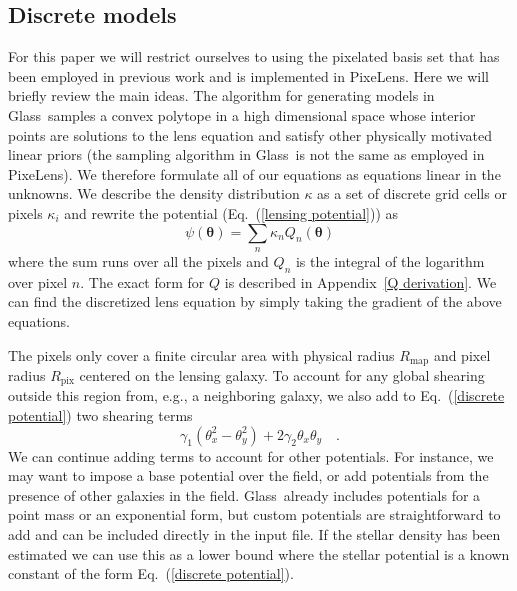 \documentclass[galley,usenatbib]{mn2e}
\newcommand{\Glass}{{\sc Glass}}
\newcommand{\PixeLens}{{\sc PixeLens}}
\newcommand{\Rmap}{\ensuremath{R_\mathrm{map}}}
\newcommand{\Rpix}{\ensuremath{R_\mathrm{pix}}}
\newcommand{\eqnref}[1] {Eq.~(\ref{#1})}
\newcommand{\appref}[1] {Appendix~\ref{#1}}
\renewcommand{\vec}[1]{\ensuremath{\boldsymbol{#1}}}
\begin{document}
\subsection{Discrete models}\label{sec:discrete}
For this paper we will restrict ourselves to using the pixelated basis set that
has been employed in previous work and is implemented in \PixeLens. Here we
will briefly review the main ideas. The algorithm for generating models in
\Glass\ samples a convex polytope in a high dimensional space whose interior
points are solutions to the lens equation and satisfy other physically
motivated linear priors (the sampling algorithm in \Glass\ is not the same as
employed in \PixeLens).  We therefore formulate all of our equations as
equations linear in the unknowns. We describe the density distribution $\kappa$
as a set of discrete grid cells or pixels $\kappa_i$ and rewrite the potential
(\eqnref{lensing potential}) as
%
\begin{equation}
  \psi(\vec\theta) = \sum_n \kappa_n Q_n(\vec\theta)
  \label{discrete potential}
\end{equation}
%
where the sum runs over all the pixels and $Q_n$ is the integral of the logarithm
over pixel $n$. The exact form for $Q$ is described in \appref{Q derivation}.
We can find the discretized lens equation by simply taking the gradient of the
above equations. 

The pixels only cover a finite circular area with physical radius $\Rmap$ and
pixel radius $\Rpix$ centered on the lensing galaxy. To account for any global
shearing outside this region from, e.g., a neighboring galaxy, we also add to
\eqnref{discrete potential} two shearing terms
%
\begin{equation}
\label{shear}
\gamma_1(\theta_x^2 - \theta_y^2) + 2\gamma_2\theta_x\theta_y\quad.
\end{equation}
%
We can continue adding terms to account for other potentials. For instance,
we may want to impose a base potential over the field, or add potentials
from the presence of other galaxies in the field. \Glass\
already includes potentials for a point mass or an exponential form, but custom
potentials are straightforward to add and can be included directly in the input file.
If the stellar density has been estimated we can use this as a lower bound
where the stellar potential is a known constant of the form \eqnref{discrete
potential}.

%
%
\end{document}
